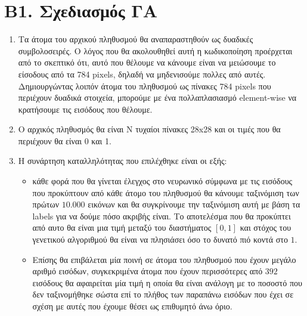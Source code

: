 \documentclass[12pt,a4paper]{article}
\newcommand{\tl}{\textlatin}
\begin{document}
        \section*{Β1. Σχεδιασμός ΓΑ}
            \begin{enumerate}
                \item Τα άτομα του αρχικού πληθυσμού θα αναπαραστηθούν ως
                    δυαδικές συμβολοσειρές. Ο λόγος που θα ακολουθηθεί αυτή η
                    κωδικοποίηση προέρχεται από το σκεπτικό ότι, αυτό που
                    θέλουμε να κάνουμε είναι να μειώσουμε το είσοδους από τα 784
                    \tl{pixels}, δηλαδή να μηδενισούμε πολλες από αυτές.
                    Δημιουργώντας λοιπόν άτομα του πληθυσμού ως πίνακες 784
                    \tl{pixels} που περιέχουν δυαδικά στοιχεία, μπορούμε με ένα
                    πολλαπλασιασμό \tl{element-wise} να κρατήσουμε τις εισόδους που
                    θέλουμε.
                \item Ο αρχικός πληθυσμός θα είναι \tl{N} τυχαίοι πίνακες
                    28\tl{x}28 και οι τιμές που θα περιέχουν θα είναι 0 και 1.
                \item Η συνάρτηση καταλληλότητας που επιλέχθηκε είναι οι εξής:
                    \begin{itemize}
                        
                        \item κάθε φορά που θα γίνεται έλεγχος στο νευρωνικό
                            σύμφωνα με τις εισόδους που προκύπτουν από κάθε
                            άτομο του πληθυσμού θα κάνουμε ταξινόμιση των πρώτων
                            $10.000$ εικόνων και θα συγκρίνουμε την ταξινόμιση
                            αυτή με βάση τα \tl{labels} για να δούμε πόσο
                            ακριβής είναι. Το αποτελέσμα που θα προκύπτει από
                            αυτο θα είναι μια τιμή μεταξύ του διαστήματος
                            $[0,1]$
                            και στόχος του γενετικού αλγοριθμού θα είναι να
                            πλησιάσει όσο το δυνατό πιό κοντά στο $1$.
                        \item Επίσης θα επιβάλεται μία ποινή σε άτομα του
                            πληθυσμού που έχουν μεγάλο αριθμό εισόδων,
                            συγκεκριμένα άτομα που έχουν περισσότερες από $392$
                            εισόδους θα αφαιρείται μία τιμή η οποία θα είναι
                            ανάλογη με το ποσοστό που δεν ταξινομήθηκε σώστα επί
                            το πλήθος των παραπάνω εισόδων που έχει σε σχέση με
                            αυτές που έχουμε θέσει ως επιθυμητό άνω όριο.


\end{itemize}
\end{enumerate}
\end{document}
